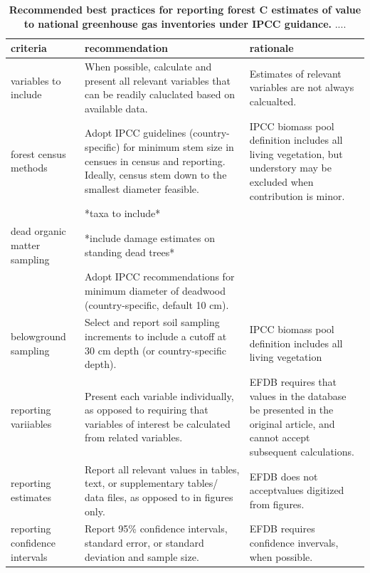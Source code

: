 \documentclass[, manuscript]{copernicus}
\begin{document}
\begin{table}

\caption{\label{tab:table_recommendations}\textbf{Recommended best practices for reporting forest C estimates of value to national greenhouse gas inventories under IPCC guidance. } ....}
\centering
\begin{tabu} to 
\hline
\textbf{criteria} & \textbf{recommendation} & \textbf{rationale}\\
\hline
variables to include & When possible, calculate and present all relevant variables that can be readily caluclated based on available data. & Estimates of relevant variables are not always calcualted.\\
\hline
forest census methods & Adopt IPCC guidelines (country-specific) for minimum stem size in censues in census and reporting. Ideally, census stem down to the smallest diameter feasible. & IPCC biomass pool definition includes all living vegetation, but understory may be excluded when contribution is minor.\\
\hline
 & *taxa to include* & \\
\hline
dead organic matter sampling & *include damage estimates on standing dead trees* & \\
\hline
 & Adopt IPCC recommendations for minimum diameter of deadwood (country-specific, default 10 cm). & \\
\hline
belowground sampling & Select and report soil sampling increments to include a cutoff at 30 cm depth (or country-specific depth). & IPCC biomass pool definition includes all living vegetation\\
\hline
reporting variiables & Present each variable individually, as opposed to requiring that variables of interest be calculated from related variables. & EFDB requires that values in the database be presented in the original article, and cannot accept subsequent calculations.\\
\hline
reporting estimates & Report all relevant values in tables, text, or supplementary tables/ data files, as opposed to in figures only. & EFDB does not acceptvalues digitized from figures.\\
\hline
reporting confidence intervals & Report 95\% confidence intervals, standard error, or standard deviation and sample size. & EFDB requires confidence invervals, when possible.\\
\hline
\end{tabu}
\end{table}
\end{document}

